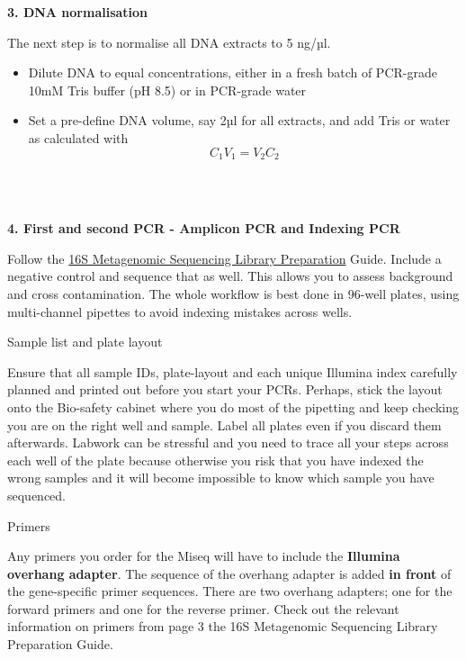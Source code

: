 \documentclass[
]{book}
\providecommand{\tightlist}{%
  \setlength{\itemsep}{0pt}\setlength{\parskip}{0pt}}
\begin{document}
\textbf{3. DNA normalisation}

The next step is to normalise all DNA extracts to 5 ng/µl.

\begin{itemize}
\tightlist
\item
  Dilute DNA to equal concentrations, either in a fresh batch of PCR-grade 10mM Tris buffer (pH 8.5) or in PCR-grade water\\
\item
  Set a pre-define DNA volume, say 2µl for all extracts, and add Tris or water as calculated with\\
  \[ C_1V_1 = V_2 C_2 \]\\
  \strut \\
\end{itemize}

\textbf{4. First and second PCR - Amplicon PCR and Indexing PCR}

Follow the \href{https://sapac.support.illumina.com/content/dam/illumina-support/documents/documentation/chemistry_documentation/16s/16s-metagenomic-library-prep-guide-15044223-b.pdf}{16S Metagenomic Sequencing Library
Preparation} Guide. Include a negative control and sequence that as well. This allows you to assess background and cross contamination. The whole workflow is best done in 96-well plates, using multi-channel pipettes to avoid indexing mistakes across wells.

Sample list and plate layout

Ensure that all sample IDs, plate-layout and each unique Illumina index carefully planned and printed out before you start your PCRs. Perhaps, stick the layout onto the Bio-safety cabinet where you do most of the pipetting and keep checking you are on the right well and sample. Label all plates even if you discard them afterwards. Labwork can be stressful and you need to trace all your steps across each well of the plate because otherwise you risk that you have indexed the wrong samples and it will become impossible to know which sample you have sequenced.

Primers

Any primers you order for the Miseq will have to include the \textbf{Illumina overhang adapter}. The sequence of the overhang adapter is added \textbf{in front} of the gene-specific primer sequences. There are two overhang adapters; one for the forward primers and one for the reverse primer. Check out the relevant information on primers from page 3 the 16S Metagenomic Sequencing Library
Preparation Guide.
\end{document}
